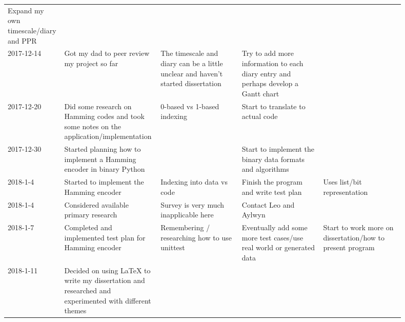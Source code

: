\documentclass{article}
\begin{document}
\begin{center}
{\begin{longtable}{p{0.1\linewidth} p{0.2\linewidth} p{0.2\linewidth} p{0.2\linewidth} p{0.2\linewidth}}
    Expand my own timescale/diary and PPR &

    \\ 2017-12-14 &

    Got my dad to peer review my project so far &

    The timescale and diary can be a little unclear and haven't started
    dissertation &

    Try to add more information to each diary entry and perhaps develop a Gantt
    chart &

    \\ 2017-12-20 &

    Did some research on Hamming codes and took some notes on the
    application/implementation &

    0-based vs 1-based indexing &

    Start to translate to actual code &

    \\ 2017-12-30 &

    Started planning how to implement a Hamming encoder in binary Python &

    &

    Start to implement the binary data formats and algorithms &

    \\ 2018-1-4 &

    Started to implement the Hamming encoder &

    Indexing into data vs code &

    Finish the program and write test plan &

    Uses list/bit representation \\ 2018-1-4 &

    Considered available primary research &

    Survey is very much inapplicable here &

    Contact Leo and Aylwyn &

    \\ 2018-1-7 &

    Completed and implemented test plan for Hamming encoder &

    Remembering / researching how to use unittest &

    Eventually add some more test cases/use real world or generated data &

    Start to work more on dissertation/how to present program \\ 2018-1-11 &

    Decided on using LaTeX to write my dissertation and researched and
    experimented with different themes &


\end{longtable}}
\end{center}
\end{document}

